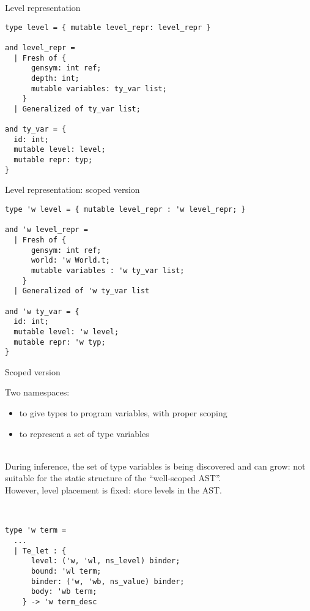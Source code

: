 \documentclass{beamer}          %
\begin{document}
\begin{frame}[fragile]{Level representation}

\begin{lstlisting}
type level = { mutable level_repr: level_repr }

and level_repr =
  | Fresh of {
      gensym: int ref;
      depth: int;
      mutable variables: ty_var list;
    }
  | Generalized of ty_var list;

and ty_var = {
  id: int;
  mutable level: level;
  mutable repr: typ;
}
\end{lstlisting}

\end{frame}

\begin{frame}[fragile]{Level representation: scoped version}

\begin{lstlisting}
type 'w level = { mutable level_repr : 'w level_repr; }

and 'w level_repr =
  | Fresh of {
      gensym: int ref;
      world: 'w World.t;
      mutable variables : 'w ty_var list;
    }
  | Generalized of 'w ty_var list

and 'w ty_var = {
  id: int;
  mutable level: 'w level;
  mutable repr: 'w typ;
}
\end{lstlisting}

\end{frame}

\begin{frame}[fragile]{Scoped version}

  Two namespaces:
  \begin{itemize}
    \setlength{\itemindent}{3em}
    \item[ns\_value] to give types to program variables, with proper scoping
    \item[ns\_level] to represent a set of type variables
  \end{itemize}
  \pause ~\\
  During inference, the set of type variables is being discovered and can grow: not suitable for the static structure of the ``well-scoped AST''. \\
  However, level placement is fixed: store levels in the AST.

\pause ~\\
\begin{lstlisting}
type 'w term =
  ...
  | Te_let : {
      level: ('w, 'wl, ns_level) binder;
      bound: 'wl term;
      binder: ('w, 'wb, ns_value) binder;
      body: 'wb term;
    } -> 'w term_desc
\end{lstlisting}

\end{frame}
\end{document}
